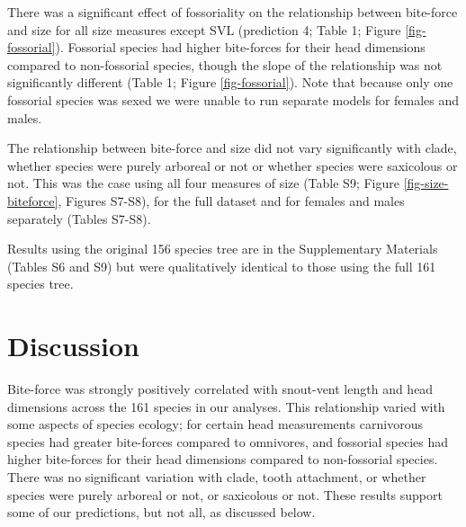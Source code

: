 \documentclass[a4paper, 12pt]{article}
\begin{document}
There was a significant effect of fossoriality on the relationship between bite-force and size for all size measures except SVL (prediction 4; Table 1; Figure \ref{fig-fossorial}). 
Fossorial species had higher bite-forces for their head dimensions compared to non-fossorial species, though the slope of the relationship was not significantly different (Table 1; Figure \ref{fig-fossorial}). 
Note that because only one fossorial species was sexed we were unable to run separate models for females and males. 

The relationship between bite-force and size did not vary significantly with clade, whether species were purely arboreal or not or whether species were saxicolous or not. 
This was the case using all four measures of size (Table S9; Figure \ref{fig-size-biteforce}, Figures S7-S8), for the full dataset and for females and males separately (Tables S7-S8). 

Results using the original 156 species tree are in the Supplementary Materials (Tables S6 and S9) but were qualitatively identical to those using the full 161 species tree.


\section{Discussion}

Bite-force was strongly positively correlated with snout-vent length and head dimensions across the 161 species in our analyses. 
This relationship varied with some aspects of species ecology; for certain head measurements carnivorous species had greater bite-forces compared to omnivores, and fossorial species had higher bite-forces for their head dimensions compared to non-fossorial species. 
There was no significant variation with clade, tooth attachment, or whether species were purely arboreal or not, or saxicolous or not. 
These results support some of our predictions, but not all, as discussed below.
\end{document}
